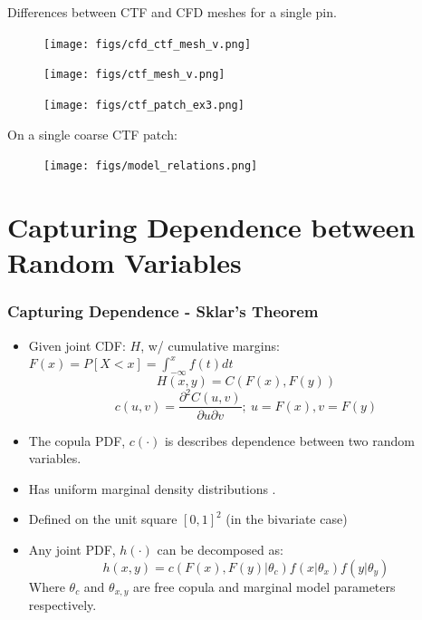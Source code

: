 \documentclass[t, pdftex]{beamer}
\begin{document}
\begin{frame}
Differences between CTF and CFD meshes for a single pin.
\begin{figure}
        \centering
        \begin{minipage}{.4\textwidth}
            \centering
            \texttt{[image: figs/cfd\_ctf\_mesh\_v.png]}
        \end{minipage}%
        \begin{minipage}{.4\textwidth}
            \centering
            \texttt{[image: figs/ctf\_mesh\_v.png]}
        \end{minipage}
\end{figure}
\end{frame}

\begin{frame}
\begin{figure}[!htbp]
\centering
\texttt{[image: figs/ctf\_patch\_ex3.png]}
\label{model_overview}
\end{figure}
\end{frame}

\begin{frame}
On a single coarse CTF patch:
\begin{figure}[!htbp]
\centering
\texttt{[image: figs/model\_relations.png]}
\label{model_overview}
\end{figure}
\end{frame}

\section{Capturing Dependence between Random Variables}
\begin{frame}
\frametitle{Capturing Dependence - Sklar's Theorem}
\begin{itemize}
\item Given joint CDF: $H$, w/ cumulative margins: $F(x)=P[X < x] = \int_{-\infty}^{x}f(t)dt$
\[
H(x,y) = C(F(x), F(y))
\]
\[
c(u, v) = \frac{\partial^2 C(u, v)}{\partial u \partial v};\ u=F(x), v=F(y)
\]
\item  The copula PDF, $c(\cdot)$ is describes dependence between two random variables.
\item  Has uniform marginal density distributions \cite{Nelsen2006}.
\item  Defined on the unit square $[0, 1]^2$ (in the bivariate case)
\item  Any joint PDF, $h(\cdot)$ can be decomposed as: \\
\[
h(x, y) = c(F(x), F(y)|\theta_c)f(x|\theta_x)f(y|\theta_y)
\]
Where $\theta_c$ and $\theta_{x,y}$ are free copula and marginal model parameters respectively.
\end{itemize}
\end{frame}
\end{document}

